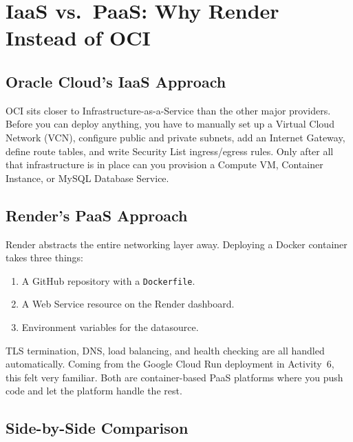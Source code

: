 \documentclass[11pt,letterpaper]{article}
\begin{document}
\section{IaaS vs.\ PaaS: Why Render Instead of OCI}

\subsection{Oracle Cloud's IaaS Approach}

OCI sits closer to Infrastructure-as-a-Service than the other major providers. Before you can deploy anything, you have to manually set up a Virtual Cloud Network (VCN), configure public and private subnets, add an Internet Gateway, define route tables, and write Security List ingress/egress rules. Only after all that infrastructure is in place can you provision a Compute VM, Container Instance, or MySQL Database Service.

\subsection{Render's PaaS Approach}

Render abstracts the entire networking layer away. Deploying a Docker container takes three things:

\begin{enumerate}[nosep]
  \item A GitHub repository with a \texttt{Dockerfile}.
  \item A Web Service resource on the Render dashboard.
  \item Environment variables for the datasource.
\end{enumerate}

TLS termination, DNS, load balancing, and health checking are all handled automatically. Coming from the Google Cloud Run deployment in Activity~6, this felt very familiar. Both are container-based PaaS platforms where you push code and let the platform handle the rest.

\subsection{Side-by-Side Comparison}
\end{document}

